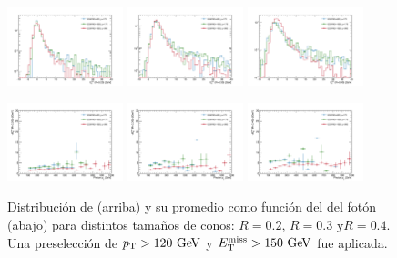 \begin{figure}[th!]
 \centering
 \includegraphics[width=0.3\textwidth]{figures/iso_20}
 \includegraphics[width=0.3\textwidth]{figures/iso_30}
 \includegraphics[width=0.3\textwidth]{figures/iso_40}

 \includegraphics[width=0.3\textwidth]{figures/iso_20_pt}
 \includegraphics[width=0.3\textwidth]{figures/iso_30_pt}
 \includegraphics[width=0.3\textwidth]{figures/iso_40_pt}

 \caption{Distribución de {\etiso} (arriba) y su promedio como función del
   {\pt} del fotón (abajo) para distintos tamaños de conos: $R=0.2$, $R=0.3$ y$R=0.4$.
   Una preselección de $\pt>120\gev$ y $\met>150\gev$ fue aplicada.}
 \label{fig:photon_iso}
\end{figure}

